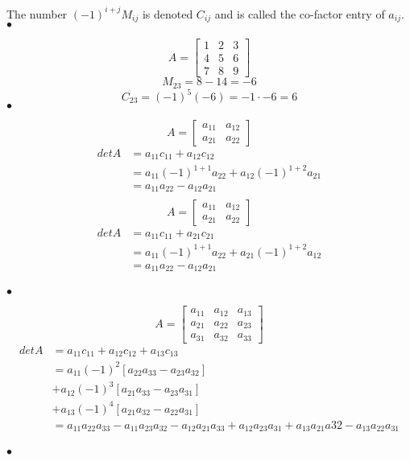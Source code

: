 \begin{definition}[Co-factor]
	The number $(-1)^{i+j}M_{ij}$ is denoted $C_{ij}$ and is called the co-factor
	entry of $a_{ij}$.
\smallskip\hfill$\bullet$\end{definition}

\begin{example}[3x3]
	\[A = \begin{bmatrix}  1 & 2 & 3 \\ 4 & 5 & 6 \\ 7 & 8 & 9 \end{bmatrix} \]
	\[M_{23} = 8 - 14 = -6\]
	\[C_{23} = (-1)^{5}(-6) = -1 \cdot -6 = 6\]
\smallskip\hfill$\bullet$\end{example}

\begin{example}[Determinant]
	\[A = \begin{bmatrix} a_{11} & a_{12} \\ a_{21} & a_{22} \end{bmatrix} \]
	\begin{align*}
	detA &=  a_{11}c_{11} + a_{12}c_{12} \\
		 &= a_{11}(-1)^{1+1}a_{22} + a_{12} (-1)^{1+2}a_{21} \\
		 &= a_{11}a_{22} - a_{12}a_{21} \\
	\end{align*}
	\[A = \begin{bmatrix} a_{11} & a_{12} \\ a_{21} & a_{22} \end{bmatrix} \]
	\begin{align*}
	detA &=  a_{11}c_{11} + a_{21}c_{21} \\
		 &= a_{11}(-1)^{1+1}a_{22} + a_{21} (-1)^{1+2}a_{12} \\
		 &= a_{11}a_{22} - a_{12}a_{21} \\
	\end{align*}

\smallskip\hfill$\bullet$\end{example}

\begin{example}[3X3 Determinant]

	\[A = \begin{bmatrix} a_{11} & a_{12} & a_{13} \\ a_{21} & a_{22} & a_{23} \\ a_{31} & a_{32} & a_{33} \end{bmatrix} \]
	\begin{align*}
		detA &= a_{11}c_{11} + a_{12}c_{12} + a_{13}c_{13} \\
			 &= a_{11}(-1)^{2}\left[ a_{22}a_{33} - a_{23}a_{32} \right] \\
			 &+ a_{12}(-1)^{3}\left[ a_{21}a_{33}- a_{23}a_{31}\right] \\
			 &+ a_{13}(-1)^{4}[a_{21}a_{32}-a_{22}a_{31}]   \\
			 &= a_{11}a_{22}a_{33} - a_{11} a_{23}a_{32} - a_{12}a_{21}a_{33} + a_{12}a_{23}a_{31} + a_{13}a_{21}a32 -a_{13}a_{22}a_{31} \\
	\end{align*}

\smallskip\hfill$\bullet$\end{example}

